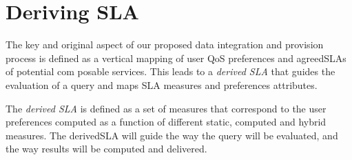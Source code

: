  
\section{Deriving SLA}
\label{sec:derivedSla}

The key and original aspect of  our proposed data integration and provision process is  defined as a vertical mapping of user QoS preferences and agreedSLAs of potential com posable services. This  leads to a {\em derived SLA} that guides the evaluation of a query and maps SLA measures and preferences attributes.  




The {\em derived SLA} is defined as a set of measures that correspond to the user preferences computed as a function of different static, computed and hybrid measures. 
The derivedSLA  will guide the way the query will be evaluated, and the way results will be computed and delivered.

